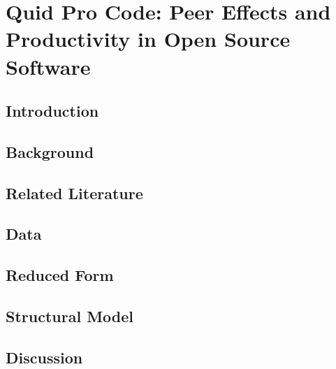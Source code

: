 \documentclass[11pt]{report}
\begin{document}

\chapter{Quid Pro Code: Peer Effects and Productivity in Open Source Software}
\label{ch:pg}

\section{Introduction} \label{sec:pg-intro}


\section{Background} \label{sec:pg-background}


\section{Related Literature} \label{sec:pg-lit}


\section{Data} \label{sec:pg-data}


\section{Reduced Form} \label{sec:pg-reduced}


\section{Structural Model} \label{sec:pg-structural}


\section{Discussion} \label{sec:pg-discussion}

\end{document}
